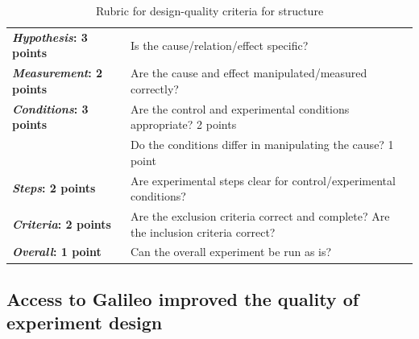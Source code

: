 \vspace{0.25in}
\begin{table}[!ht]
\caption[Rubric for design-quality criteria for structure]
{Rubric for design-quality criteria for structure}

\vspace{-0.25in}
\begin{center}
\renewcommand{\arraystretch}{1.5}
\begin{tabular}{p{1.75in}p{3.5in}}
\hline
\textbf{\textit{Hypothesis}: 3 points} & Is the cause/relation/effect specific?  \\
\textbf{\textit{Measurement}: 2 points} & Are the cause and effect manipulated/measured correctly? \\
\textbf{\textit{Conditions}: 3 points}  & Are the control and experimental conditions appropriate? 2 points \\
 & Do the conditions differ in manipulating the cause? 1 point \\
\textbf{\textit{Steps}: 2 points}  & Are experimental steps clear for control/experimental conditions?  \\
\textbf{\textit{Criteria}: 2 points} & Are the exclusion criteria correct and complete? Are the inclusion criteria correct? \\
\textbf{\textit{Overall}: 1 point} & Can the overall experiment be run as is?  \\
\hline
\end{tabular}
\end{center}
\label{tab:rubric1}
\end{table}

\subsection{Access to Galileo improved the quality of experiment design}


